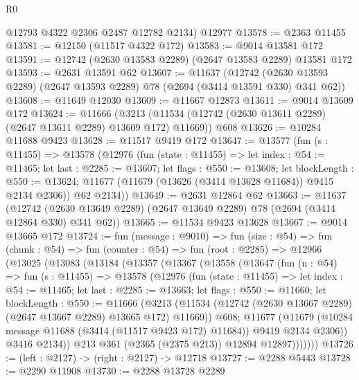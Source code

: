 \begin{lexlean}{R0}
\begin{coremodule}
      @12793
      @4322
      @2306
      @2487
      @12782
      @2134)
    @12977
@13578 := @2363 @11455
@13581 := @12150 (@11517 @4322 @172)
@13583 := @9014 @13581 @172
@13591 := @12742 (@2630 @13583 @2289) (@2647 @13583 @2289) @13581 @172
@13593 := @2631 @13591 @62
@13607 := @11637
    (@12742 (@2630 @13593 @2289) (@2647 @13593 @2289) @78 (@2694 (@3414 @13591 @330) @341 @62))
@13608 := @11649 @12030
@13609 := @11667 @12873
@13611 := @9014 @13609 @172
@13624 := @11666
    (@3213 (@11534 (@12742 (@2630 @13611 @2289) (@2647 @13611 @2289) @13609 @172) @11669))
    @608
@13626 := @10284 @11688 @9423
@13628 := @11517 @9419 @172
@13647 := @13577
    (fun (s : @11455) =>
    @13578
      (@12976
        (fun (state : @11455) =>
        let index : @54 := @11465;
        let last : @2285 := @13607;
        let flags : @550 := @13608;
        let blockLength : @550 := @13624;
        @11677 (@11679 (@13626 (@3414 @13628 @11684)) @9415 @2134 @2306))
        @62
        @2134))
@13649 := @2631 @12864 @62
@13663 := @11637
    (@12742 (@2630 @13649 @2289) (@2647 @13649 @2289) @78 (@2694 (@3414 @12864 @330) @341 @62))
@13665 := @11534 @9423 @13628
@13667 := @9014 @13665 @172
@13724 := fun (message : @9010) =>
  fun (size : @54) =>
  fun (chunk : @54) =>
  fun (counter : @54) =>
  fun (root : @2285) =>
  @12966
    (@13025
      (@13083
        (@13184
          (@13357
            (@13367
              (@13558
                (@13647
                  (fun (n : @54) =>
                  fun (s : @11455) =>
                  @13578
                    (@12976
                      (fun (state : @11455) =>
                      let index : @54 := @11465;
                      let last : @2285 := @13663;
                      let flags : @550 := @11660;
                      let blockLength : @550 := @11666
                        (@3213
                          (@11534
                            (@12742 (@2630 @13667 @2289) (@2647 @13667 @2289) @13665 @172)
                            @11669))
                        @608;
                      @11677
                        (@11679
                          (@10284 message @11688 (@3414 (@11517 @9423 @172) @11684))
                          @9419
                          @2134
                          @2306))
                      @3416
                      @2134))
                  @213
                  @361
                  (@2365 (@2375 @213))
                  @12894
                  @12897)))))))
@13726 := (left : @2127) -> (right : @2127) -> @12718
@13727 := @2288 @5443
@13728 := @2290 @11908
@13730 := @2288 @13728 @2289

\end{coremodule}
\end{lexlean}
